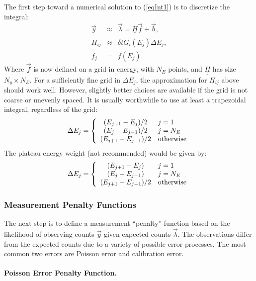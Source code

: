 \documentclass{article}    %
\newcommand{\dbul}[1]{\underline{\underline{#1}}}
\newcommand{\subsubsubsection}[1]{\paragraph{#1.}}
\begin{document}
The first step toward a numerical solution to (\ref{eqInt1}) is to discretize the integral:
\begin{eqnarray}
\vec{y} &\approx& \vec{\lambda} = \dbul{H}\vec{f} + \vec{b}, \\
H_{ij} &\approx& \delta t G_i(E_j) \Delta E_j, \\
f_j &=& f(E_j).
\end{eqnarray}
Where $\vec{f}$ is now defined on a grid in energy, with $N_E$ points,
and $\dbul{H}$ has size $N_y \times N_E$. For a sufficiently fine grid
in $\Delta E_j$, the approximation for $H_{ij}$ above should work
well. However, slightly better choices are available if the grid
is not coarse or unevenly spaced. It is usually worthwhile to use
at least a trapezoidal integral, regardless of the grid:
\begin{equation}
  \Delta E_j = \left\{
\begin{array}{cl}
(E_{j+1}-E_j)/2 & j=1 \\
(E_{j}-E_{j-1})/2 & j=N_E \\
(E_{j+1}-E_{j-1})/2 & {\rm otherwise}
\end{array}
\right.
\end{equation}
The plateau energy weight (not recommended) would be given by:
\begin{equation}
  \Delta E_j = \left\{
\begin{array}{cl}
(E_{j+1}-E_j) & j=1 \\
(E_{j}-E_{j-1}) & j=N_E \\
(E_{j+1}-E_{j-1})/2 & {\rm otherwise}
\end{array}
\right.
\end{equation}



\subsubsection{Measurement Penalty Functions}

The next step is to define a measurement ``penalty'' function based on
the likelihood of observing counts $\vec{y}$ given expected counts
$\vec{\lambda}$. The observations differ from the expected counts due
to a variety of possible error processes. The most common two errors
are Poisson error and calibration error.

\subsubsubsection{Poisson Error Penalty Function}
\end{document}
